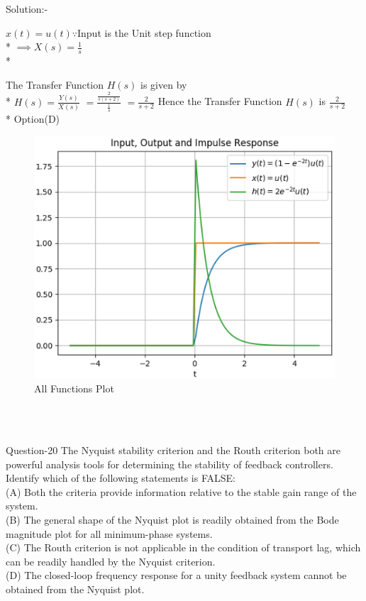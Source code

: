 \documentclass[journal,12pt,twocolumn]{IEEEtran}
\begin{document}
\begin{frame}{Solution:- }
\begin{frame}{}
\begin{frame}{}
\vskip 1cm
$x(t) = u(t)  \because  $Input is the Unit step function\\*
\vskip 0.3cm
$\implies X(s) = \frac{1}{s}$\\*

\end{frame}

\begin{frame}{}

The Transfer Function $H(s)$ is given by\\*
\vskip 0.3cm
$H(s) = \frac{Y(s)}{X(s)}$
$= \frac{\frac{2}{s(s+2)}}{\frac{1}{s}}$
$= \frac{2}{s+2}$
\vskip 1cm
Hence the Transfer Function $H(s)$ is $\frac{2}{s+2}$\\*
Option(D)
\end{frame}

\begin{frame}{}

\begin{figure}
  \includegraphics[width=\linewidth]{./figs/Plot_1.eps}
  \caption{All Functions Plot}
\end{figure}
\end{frame}
\\\\
\begin{frame}{Question-20 }
The Nyquist stability criterion and the Routh criterion both are powerful analysis tools for
determining the stability of feedback controllers. Identify which of the following statements
is FALSE:
\\
(A) Both the criteria provide information relative to the stable gain range of the system.
\\(B) The general shape of the Nyquist plot is readily obtained from the Bode magnitude plot
for all minimum-phase systems.
\\(C) The Routh criterion is not applicable in the condition of transport lag, which can be
readily handled by the Nyquist criterion.
\\ (D) The closed-loop frequency response for a unity feedback system cannot be obtained
from the Nyquist plot. 


\end{frame}
\end{frame}
\end{frame}
\end{document}
